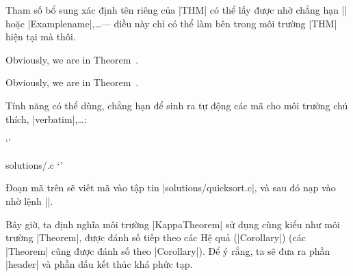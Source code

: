 Tham số bổ sung xác định tên riêng của |THM| có thể lấy được nhờ 
chẳng hạn |\Theoremname| hoặc |Examplename|,\ldots --- điều này chỉ
có thể làm bên trong môi trường |THM| hiện tại mà thôi.

\begin{command}
  \begin{Theorem}[\color{red}{some name}\normalcolor]
  Obviously, we are in Theorem~\Theoremname.
  \end{Theorem}
\end{command}
\begin{Theorem}[\color{red}{some name}\normalcolor]
Obviously, we are in Theorem~\Theoremname.
\end{Theorem}

Tính năng có thể dùng, chẳng hạn để sinh ra tự động các mã
cho môi trường chú thích, |verbatim|,\ldots:
\begin{command}
  \begin{exercise}[quicksort]
   `'
  \begin{verbatimwrite}{solutions/\exercisename.c}
   `'
  \end{verbatimwrite}
  
  \end{exercise}
\end{command}
Đoạn mã trên sẽ viết mã  vào tập tin |solutions/quicksort.c|,
và sau đó nạp vào nhờ lệnh ||.

\medskip
Bây giờ, ta định nghĩa môi trường |KappaTheorem| sử dụng cùng kiểu
như môi trường |Theorem|, được đánh số tiếp theo các Hệ quả (|Corollary|)
(các |Theorem| cũng được đánh số theo |Corollary|). Để ý rằng,
ta sẽ đưa ra phần |header| và phần dấu kết thúc khá phức tạp.

\begin{command}
  \newtheorem{KappaTheorem}[Theorem]{\(\kappa\)-Theorem}
\end{command}

